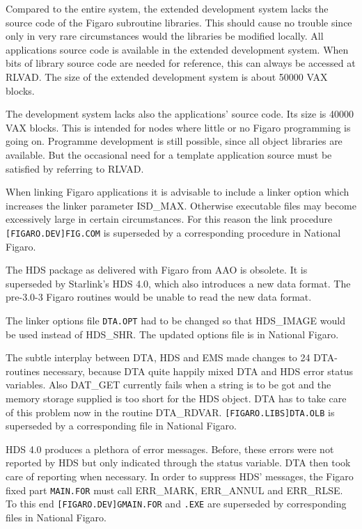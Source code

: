 Compared to the entire system, the extended development system lacks the source
code of the Figaro subroutine libraries. This should cause no trouble since
only in very rare circumstances would the libraries be modified locally. All
applications source code is available in the extended development system. When
bits of library source code are needed for reference, this can always be
accessed at RLVAD. The size of the extended development system is about 50000
VAX blocks.

The development system lacks also the applications' source code. Its size is
40000 VAX blocks. This is intended for nodes where little or no Figaro
programming is going on. Programme development is still possible, since all
object libraries are available. But the occasional need for a template
application source must be satisfied by referring to RLVAD.

When linking Figaro applications it is advisable to include a linker option
which increases the linker parameter ISD\_MAX. Otherwise executable files may
become excessively large in certain circumstances. For this reason the link
procedure {\tt [FIGARO.\-DEV]\-FIG.COM} is superseded by a corresponding
procedure in National Figaro.

The HDS package as delivered with Figaro from AAO is obsolete. It is superseded
by Starlink's HDS 4.0, which also introduces a new data format. The pre-3.0-3
Figaro routines would be unable to read the new data format.

The linker options file {\tt DTA.OPT} had to be changed so that HDS\_IMAGE
would be used instead of HDS\_SHR. The updated options file is in National
Figaro.

The subtle interplay between DTA, HDS and EMS made changes to 24 DTA-routines
necessary, because DTA quite happily mixed DTA and HDS error status variables.
Also DAT\_GET currently fails when a string is to be got and the memory storage
supplied is too short for the HDS object. DTA has to take care of this problem
now in the routine DTA\_RDVAR. {\tt [FIGARO.\-LIBS]\-DTA.OLB} is superseded by
a corresponding file in National Figaro.

HDS 4.0 produces a plethora of error messages. Before, these errors were not
reported by HDS but only indicated through the status variable. DTA then took
care of reporting when necessary. In order to suppress HDS' messages, the
Figaro fixed part {\tt MAIN.FOR} must call ERR\_MARK, ERR\_ANNUL and ERR\_RLSE.
To this end {\tt [FIGARO.DEV]GMAIN.FOR} and {\tt .EXE} are superseded by
corresponding files in National Figaro.

